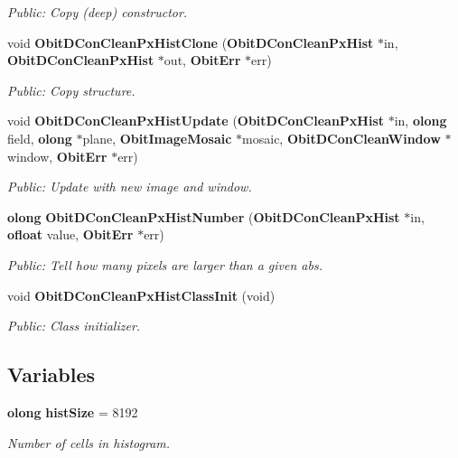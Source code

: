 \begin{CompactItemize}
\begin{CompactList}\small\item\em Public: Copy (deep) constructor. \item\end{CompactList}\item 
void {\bf Obit\-DCon\-Clean\-Px\-Hist\-Clone} ({\bf Obit\-DCon\-Clean\-Px\-Hist} $\ast$in, {\bf Obit\-DCon\-Clean\-Px\-Hist} $\ast$out, {\bf Obit\-Err} $\ast$err)
\begin{CompactList}\small\item\em Public: Copy structure. \item\end{CompactList}\item 
void {\bf Obit\-DCon\-Clean\-Px\-Hist\-Update} ({\bf Obit\-DCon\-Clean\-Px\-Hist} $\ast$in, {\bf olong} field, {\bf olong} $\ast$plane, {\bf Obit\-Image\-Mosaic} $\ast$mosaic, {\bf Obit\-DCon\-Clean\-Window} $\ast$window, {\bf Obit\-Err} $\ast$err)
\begin{CompactList}\small\item\em Public: Update with new image and window. \item\end{CompactList}\item 
{\bf olong} {\bf Obit\-DCon\-Clean\-Px\-Hist\-Number} ({\bf Obit\-DCon\-Clean\-Px\-Hist} $\ast$in, {\bf ofloat} value, {\bf Obit\-Err} $\ast$err)
\begin{CompactList}\small\item\em Public: Tell how many pixels are larger than a given abs. \item\end{CompactList}\item 
void {\bf Obit\-DCon\-Clean\-Px\-Hist\-Class\-Init} (void)
\begin{CompactList}\small\item\em Public: Class initializer. \item\end{CompactList}\end{CompactItemize}
\subsection*{Variables}
\begin{CompactItemize}
\item 
{\bf olong} {\bf hist\-Size} = 8192
\begin{CompactList}\small\item\em Number of cells in histogram. \item\end{CompactList}\end{CompactItemize}


